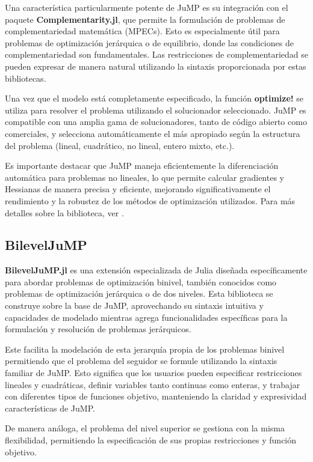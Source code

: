 Una característica particularmente potente de JuMP es su integración con el paquete \textbf{Complementarity.jl}, que permite la formulación de problemas de complementariedad matemática (MPECs). Esto es especialmente útil para problemas de optimización jerárquica o de equilibrio, donde las condiciones de complementariedad son fundamentales. Las restricciones de complementariedad se pueden expresar de manera natural utilizando la sintaxis proporcionada por estas bibliotecas.

Una vez que el modelo está completamente especificado, la función \textbf{optimize!} se utiliza para resolver el problema utilizando el solucionador seleccionado. JuMP es compatible con una amplia gama de solucionadores, tanto de código abierto como comerciales, y selecciona automáticamente el más apropiado según la estructura del problema (lineal, cuadrático, no lineal, entero mixto, etc.).

Es importante destacar que JuMP maneja eficientemente la diferenciación automática para problemas no lineales, lo que permite calcular gradientes y Hessianas de manera precisa y eficiente, mejorando significativamente el rendimiento y la robustez de los métodos de optimización utilizados.
Para m\'as detalles sobre la biblioteca, ver \cite{JuMPPaper}.
\subsection*{BilevelJuMP}
\textbf{BilevelJuMP.jl} es una extensión especializada de Julia diseñada específicamente para abordar problemas de optimización binivel, también conocidos como problemas de optimización jerárquica o de dos niveles. Esta biblioteca se construye sobre la base de JuMP, aprovechando su sintaxis intuitiva y capacidades de modelado mientras agrega funcionalidades específicas para la formulación y resolución de problemas jerárquicos.

Este facilita la modelación de esta jerarquía propia de los problemas binivel permitiendo que el problema del seguidor se formule utilizando la sintaxis familiar de JuMP. Esto significa que los usuarios pueden especificar restricciones lineales y cuadráticas, definir variables tanto continuas como enteras, y trabajar con diferentes tipos de funciones objetivo, manteniendo la claridad y expresividad características de JuMP. 

De manera análoga, el problema del nivel superior se gestiona con la misma flexibilidad, permitiendo la especificación de sus propias restricciones y función objetivo.

